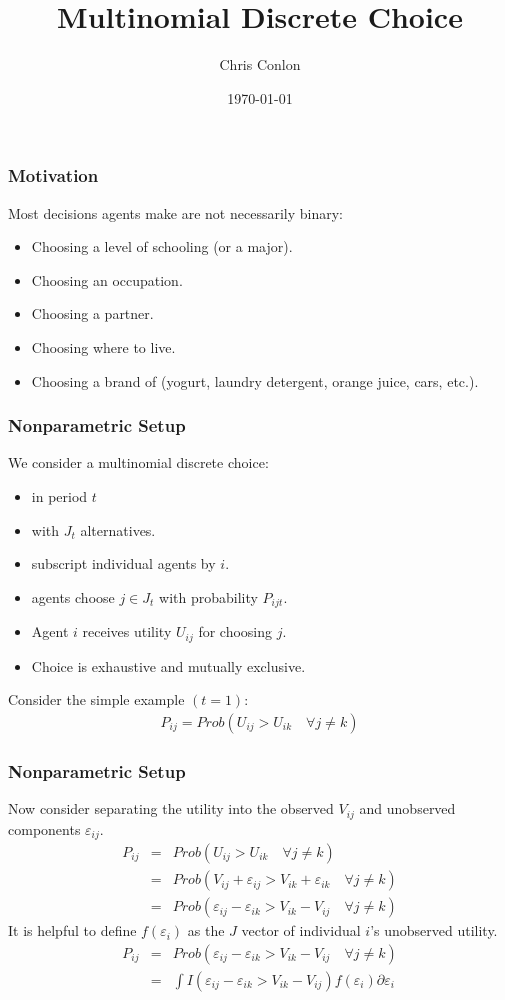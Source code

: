 \documentclass[xcolor=pdftex,dvipsnames,table,mathserif]{beamer}
\begin{document}
\title{Multinomial Discrete Choice}
\author{Chris Conlon}
\date{\today}

\frame{\titlepage}


\begin{frame}
\frametitle{Motivation}
Most decisions agents make are not necessarily binary:
\begin{itemize}
\item Choosing a level of schooling (or a major).
\item Choosing an occupation.
\item Choosing a partner.
\item Choosing where to live.
\item Choosing a brand of (yogurt, laundry detergent, orange juice, cars, etc.).
 \end{itemize}
\end{frame}

\begin{frame}
\frametitle{Nonparametric Setup}
We consider a \alert{multinomial discrete choice}:
\begin{itemize}
\item in period $t$
\item with $J_t$ alternatives.
\item subscript individual agents by $i$.
\item agents choose $j \in J_t$ with probability $P_{ijt}$.
\item Agent $i$ receives utility $U_{ij}$ for choosing $j$.
\item Choice is exhaustive and mutually exclusive.
 \end{itemize}\pause
Consider the simple example $(t=1)$:
\begin{eqnarray*}
P_{ij} = Prob( U_{ij} > U_{ik} \quad \forall j \neq k)
\end{eqnarray*}
\end{frame}

\begin{frame}
\frametitle{Nonparametric Setup}
Now consider separating the utility into the observed $V_{ij}$ and unobserved components $\varepsilon_{ij}$.
\begin{eqnarray*}
P_{ij} &=& Prob( U_{ij} > U_{ik} \quad \forall j \neq k)\\
 &=& Prob( V_{ij} + \varepsilon_{ij} > V_{ik} + \varepsilon_{ik} \quad \forall j \neq k)\\
 &=& Prob( \varepsilon_{ij}-\varepsilon_{ik} > V_{ik} - V_{ij} \quad \forall j \neq k)
\end{eqnarray*}
\pause
It is helpful to define $f(\varepsilon_{i})$ as the $J$ vector of individual $i$'s unobserved utility.
\begin{eqnarray*}
P_{ij} &=& Prob( \varepsilon_{ij}-\varepsilon_{ik} > V_{ik} - V_{ij} \quad \forall j \neq k)\\
&=& \int I( \varepsilon_{ij}-\varepsilon_{ik} > V_{ik} - V_{ij} ) f( \varepsilon_i) \partial \varepsilon_i \\
\end{eqnarray*}
\end{frame}
\end{document}
